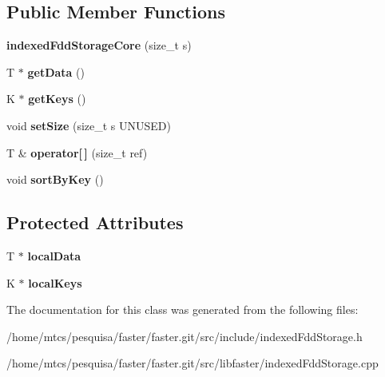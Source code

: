 \subsection*{Public Member Functions}
\begin{DoxyCompactItemize}
\item 
\hypertarget{classfaster_1_1indexedFddStorageCore_a8ef8f11997d28af03b02f84a632beeea}{}\label{classfaster_1_1indexedFddStorageCore_a8ef8f11997d28af03b02f84a632beeea} 
{\bfseries indexed\+Fdd\+Storage\+Core} (size\+\_\+t s)
\item 
\hypertarget{classfaster_1_1indexedFddStorageCore_ace53399ba953aa365a2121cadc613d77}{}\label{classfaster_1_1indexedFddStorageCore_ace53399ba953aa365a2121cadc613d77} 
T $\ast$ {\bfseries get\+Data} ()
\item 
\hypertarget{classfaster_1_1indexedFddStorageCore_a8c81c09139ac2042b0d15728317dc12b}{}\label{classfaster_1_1indexedFddStorageCore_a8c81c09139ac2042b0d15728317dc12b} 
K $\ast$ {\bfseries get\+Keys} ()
\item 
\hypertarget{classfaster_1_1indexedFddStorageCore_a8f39ec402c0c3307ae3df58e1a172743}{}\label{classfaster_1_1indexedFddStorageCore_a8f39ec402c0c3307ae3df58e1a172743} 
void {\bfseries set\+Size} (size\+\_\+t s U\+N\+U\+S\+ED)
\item 
\hypertarget{classfaster_1_1indexedFddStorageCore_a24cb4a85df359d86a39522a4f6ff7790}{}\label{classfaster_1_1indexedFddStorageCore_a24cb4a85df359d86a39522a4f6ff7790} 
T \& {\bfseries operator\mbox{[}$\,$\mbox{]}} (size\+\_\+t ref)
\item 
\hypertarget{classfaster_1_1indexedFddStorageCore_a36e8a7c036dad67bde3e34925b65f68d}{}\label{classfaster_1_1indexedFddStorageCore_a36e8a7c036dad67bde3e34925b65f68d} 
void {\bfseries sort\+By\+Key} ()
\end{DoxyCompactItemize}
\subsection*{Protected Attributes}
\begin{DoxyCompactItemize}
\item 
\hypertarget{classfaster_1_1indexedFddStorageCore_afc155f998bfe42973147af89bf75cfa5}{}\label{classfaster_1_1indexedFddStorageCore_afc155f998bfe42973147af89bf75cfa5} 
T $\ast$ {\bfseries local\+Data}
\item 
\hypertarget{classfaster_1_1indexedFddStorageCore_a4a31c9b81ef61a2aca489bdc010566f9}{}\label{classfaster_1_1indexedFddStorageCore_a4a31c9b81ef61a2aca489bdc010566f9} 
K $\ast$ {\bfseries local\+Keys}
\end{DoxyCompactItemize}


The documentation for this class was generated from the following files\+:\begin{DoxyCompactItemize}
\item 
/home/mtcs/pesquisa/faster/faster.\+git/src/include/indexed\+Fdd\+Storage.\+h\item 
/home/mtcs/pesquisa/faster/faster.\+git/src/libfaster/indexed\+Fdd\+Storage.\+cpp\end{DoxyCompactItemize}
